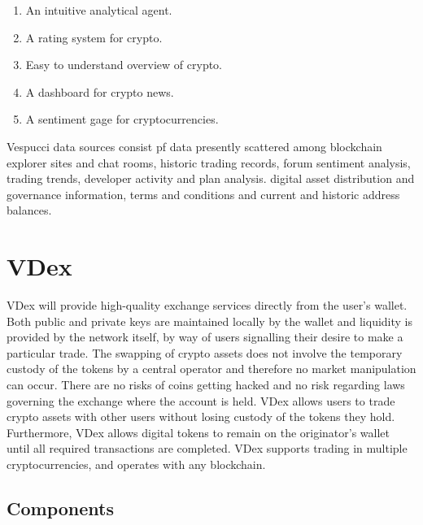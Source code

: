 \documentclass[]{article}
\begin{document}
\begin{enumerate}
	\item An intuitive analytical agent.
	\item A rating system for crypto.
	\item Easy to understand overview of crypto.
	\item A dashboard for crypto news.
	\item A sentiment gage for cryptocurrencies. 
\end{enumerate}
Vespucci data sources consist pf data presently scattered among blockchain explorer sites and chat rooms,
historic trading records, forum sentiment analysis, trading trends, developer activity and plan analysis.
digital asset distribution and governance information, terms and conditions and current and historic address balances.





\section {VDex}

VDex will provide high-quality exchange services directly from the user's wallet.
Both public and private keys are maintained locally by the wallet and liquidity is provided by the network itself, by way of users signalling their desire to make a particular trade. 
The swapping of crypto assets does not involve the temporary custody of the tokens by a central operator and therefore no market manipulation can occur.
There are no risks of coins getting hacked and no risk regarding laws governing the exchange where the account is held.
VDex allows users to trade crypto assets with other users without losing custody of the tokens they hold. 
Furthermore, VDex allows digital tokens to remain on the originator's wallet until all required transactions are completed. VDex supports trading in multiple cryptocurrencies, and operates with any blockchain.



									
\subsection{Components}
	
\end{document}
